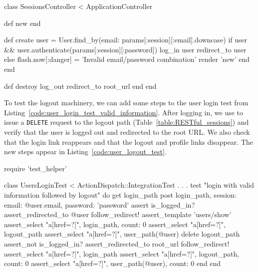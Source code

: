 \begin{codelisting}
\label{code:destroy_session}
\begin{code}
class SessionsController < ApplicationController

  def new
  end

  def create
    user = User.find_by(email: params[:session][:email].downcase)
    if user && user.authenticate(params[:session][:password])
      log_in user
      redirect_to user
    else
      flash.now[:danger] = 'Invalid email/password combination'
      render 'new'
    end
  end

  def destroy
    log_out
    redirect_to root_url
  end
end
\end{code}
\end{codelisting}

To test the logout machinery, we can add some steps to the user login test from Listing~\ref{code:user_login_test_valid_information}. After logging in, we use  to issue a \texttt{DELETE} request to the logout path (Table~\ref{table:RESTful_sessions}) and verify that the user is logged out and redirected to the root URL. We also check that the login link reappears and that the logout and profile links disappear. The new steps appear in Listing~\ref{code:user_logout_test}.

\begin{codelisting}
\label{code:user_logout_test}
\begin{code}
require 'test_helper'

class UsersLoginTest < ActionDispatch::IntegrationTest
  .
  .
  .
  test "login with valid information followed by logout" do
    get login_path
    post login_path, session: { email: @user.email, password: 'password' }
    assert is_logged_in?
    assert_redirected_to @user
    follow_redirect!
    assert_template 'users/show'
    assert_select "a[href=?]", login_path, count: 0
    assert_select "a[href=?]", logout_path
    assert_select "a[href=?]", user_path(@user)
    delete logout_path
    assert_not is_logged_in?
    assert_redirected_to root_url
    follow_redirect!
    assert_select "a[href=?]", login_path
    assert_select "a[href=?]", logout_path,      count: 0
    assert_select "a[href=?]", user_path(@user), count: 0
  end
end
\end{code}
\end{codelisting}

